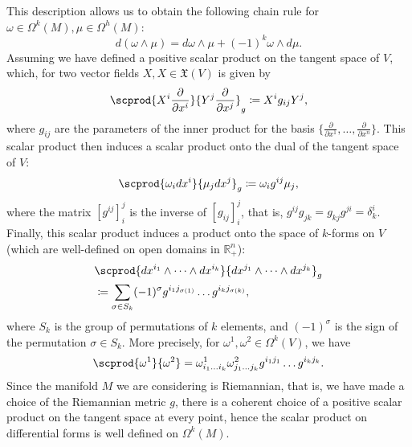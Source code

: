 \documentclass{ifacconf}
\newcommand{\R}{\mathbb{R}}
\newcommand{\drh}[2]{\Omega^{#2}(#1)}
\begin{document}
This description allows us to obtain the following chain rule for $\omega\in\drh{M}{k},\mu\in\drh{M}{h}$:
\begin{equation}\label{chain}
    d(\omega\wedge\mu)=d\omega\wedge\mu+(-1)^k\omega\wedge d\mu.
\end{equation}
Assuming we have defined a positive scalar product on the tangent space of $V$, which, for two vector fields $X,X\in \mathfrak{X}(V)$ is given by
\[
    \scprod{X^i\frac{\partial}{\partial x^i}}{Y^j\frac{\partial}{\partial x^j}}_g\coloneqq X^ig_{ij}Y^j,
\]
where $g_{ij}$ are the parameters of the inner product for the basis $\{\frac{\partial}{\partial x^1},\dots,\frac{\partial}{\partial x^n}\}$. This scalar product then induces a scalar product onto the dual of the tangent space of $V$:
\[
    \scprod{\omega_i dx^i}{\mu_jdx^j}_g\coloneqq \omega_ig^{ij}\mu_j,
\]
where the matrix $[g^{ij}]_i^j$ is the inverse of $[g_{ij}]_i^j$, that is, $g^{ij}g_{jk}=g_{kj}g^{ji}=\delta_k^i$.\\
Finally, this scalar product induces a product onto the space of $k$-forms on $V$ (which are well-defined on open domains in $\R^n_+$):
\begin{align*}
    &\scprod{dx^{i_1}\wedge \dots\wedge dx^{i_k}}{dx^{j_1}\wedge \dots\wedge dx^{j_k}}_g\\
    &\coloneqq \sum_{\sigma\in S_k}(-1)^{\sigma}g^{i_1j_{\sigma(1)}}\dots g^{i_kj_{\sigma(k)}},
\end{align*}
where $S_k$ is the group of permutations of $k$ elements, and $(-1)^{\sigma}$ is the sign of the permutation $\sigma\in S_k$. More precisely, for $\omega^1,\omega^2\in \drh{V}{k}$, we have
\[
    \scprod{\omega^1}{\omega^2}=\omega_{i_1\dots i_k}^1\omega_{j_1\dots j_k}^2g^{i_1j_1}\dots g^{i_kj_k}.
\]
Since the manifold $M$ we are considering is Riemannian, that is, we have made a choice of the Riemannian metric $g$, there is a coherent choice of a positive scalar product on the tangent space at every point, hence the scalar product on differential forms is well defined on $\drh{M}{k}$.
\end{document}

